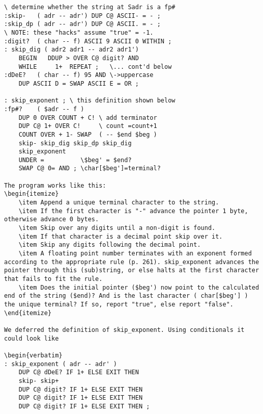 \begin{verbatim}
\ determine whether the string at Sadr is a fp#
:skip-   ( adr -- adr') DUP C@ ASCII- = - ;
:skip_dp ( adr -- adr') DUP C@ ASCII. = - ;
\ NOTE: these "hacks" assume "true" = -1.
:digit?  ( char -- f) ASCII 9 ASCII 0 WITHIN ;
: skip_dig ( adr2 adr1 -- adr2 adr1')
    BEGIN   DDUP > OVER C@ digit? AND
    WHILE     1+  REPEAT ;   \... cont'd below
:dDeE?   ( char -- f) 95 AND \->uppercase
    DUP ASCII D = SWAP ASCII E = OR ;

: skip_exponent ; \ this definition shown below
:fp#?    ( $adr -- f )
    DUP 0 OVER COUNT + C! \ add terminator
    DUP C@ 1+ OVER C!     \ count =count+1
    COUNT OVER + 1- SWAP  ( -- $end $beg )
    skip- skip_dig skip_dp skip_dig
    skip_exponent
    UNDER =          \$beg' = $end?
    SWAP C@ 0= AND ; \char[$beg']=terminal?

The program works like this:
\begin{itemize}
    \item Append a unique terminal character to the string.
    \item If the first character is "-" advance the pointer 1 byte, otherwise advance 0 bytes.
    \item Skip over any digits until a non-digit is found.
    \item If that character is a decimal point skip over it.
    \item Skip any digits following the decimal point.
    \item A floating point number terminates with an exponent formed according to the appropriate rule (p. 261). skip_exponent advances the pointer through this (sub)string, or else halts at the first character that fails to fit the rule.
    \item Does the initial pointer ($beg') now point to the calculated end of the string ($end)? And is the last character ( char[$beg'] ) the unique terminal? If so, report "true", else report "false".
\end{itemize}

We deferred the definition of skip_exponent. Using conditionals it could look like

\begin{verbatim}
: skip_exponent ( adr -- adr' )
    DUP C@ dDeE? IF 1+ ELSE EXIT THEN
    skip- skip+
    DUP C@ digit? IF 1+ ELSE EXIT THEN
    DUP C@ digit? IF 1+ ELSE EXIT THEN
    DUP C@ digit? IF 1+ ELSE EXIT THEN ;
\end{verbatim}

